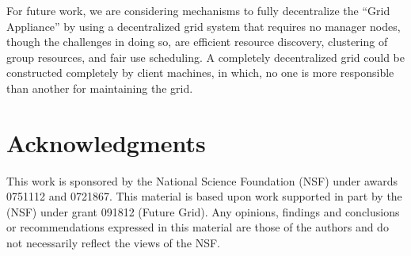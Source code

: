 \documentclass[conference]{IEEEtran}
\begin{document}
For future work, we are considering mechanisms to fully decentralize the ``Grid
Appliance'' by using a decentralized grid system that requires no manager
nodes, though the challenges in doing so, are efficient resource discovery,
clustering of group resources, and fair use scheduling.  A completely
decentralized grid could be constructed completely by client machines, in
which, no one is more responsible than another for maintaining the grid.

\section*{Acknowledgments}

This work is sponsored by the National Science Foundation (NSF) under awards
0751112 and 0721867.  This material is based upon work supported in part by the
(NSF) under grant 091812 (Future Grid).  Any opinions, findings and conclusions
or recommendations expressed in this material are those of the authors and do
not necessarily reflect the views of the NSF.



\end{document}
